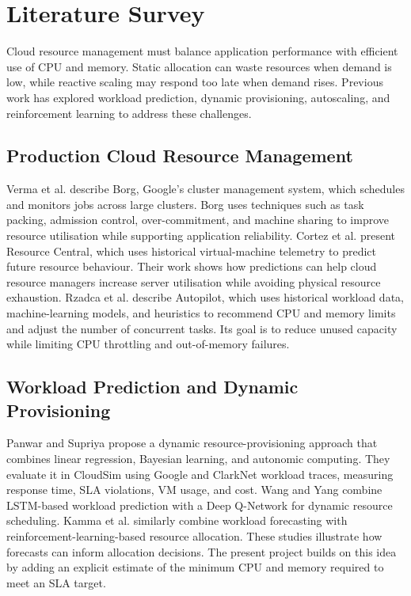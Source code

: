 \documentclass[12pt,a4paper]{report}
\begin{document}
\chapter{Literature Survey}
Cloud resource management must balance application performance with efficient use of CPU and memory. Static allocation can waste resources when demand is low, while reactive scaling may respond too late when demand rises. Previous work has explored workload prediction, dynamic provisioning, autoscaling, and reinforcement learning to address these challenges.

\section{Production Cloud Resource Management}
Verma et al. describe Borg, Google's cluster management system, which schedules and monitors jobs across large clusters. Borg uses techniques such as task packing, admission control, over-commitment, and machine sharing to improve resource utilisation while supporting application reliability.
Cortez et al. present Resource Central, which uses historical virtual-machine telemetry to predict future resource behaviour. Their work shows how predictions can help cloud resource managers increase server utilisation while avoiding physical resource exhaustion. Rzadca et al. describe Autopilot, which uses historical workload data, machine-learning models, and heuristics to recommend CPU and memory limits and adjust the number of concurrent tasks. Its goal is to reduce unused capacity while limiting CPU throttling and out-of-memory failures.
\lipsum[14-16]

\section{Workload Prediction and Dynamic Provisioning}
Panwar and Supriya propose a dynamic resource-provisioning approach that combines linear regression, Bayesian learning, and autonomic computing. They evaluate it in CloudSim using Google and ClarkNet workload traces, measuring response time, SLA violations, VM usage, and cost.
Wang and Yang combine LSTM-based workload prediction with a Deep Q-Network for dynamic resource scheduling. Kamma et al. similarly combine workload forecasting with reinforcement-learning-based resource allocation. These studies illustrate how forecasts can inform allocation decisions. The present project builds on this idea by adding an explicit estimate of the minimum CPU and memory required to meet an SLA target.
\lipsum[17-18]
\end{document}
